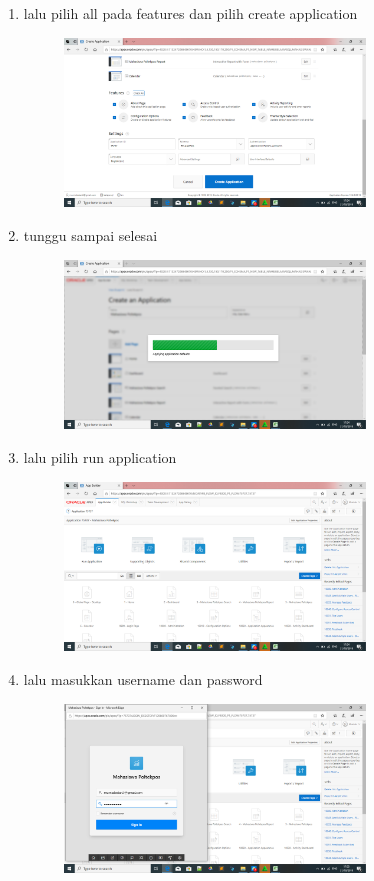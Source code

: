 \documentclass{article}
\begin{document}
\begin{enumerate}
\begin{figure}[h]
\end{figure}
\item lalu pilih all pada features dan pilih create application
    \begin{figure}[h]
   \centerline{\includegraphics[width=8cm]{figure/da.png}}
\end{figure}
\newpage\item tunggu sampai selesai
    \begin{figure}[h]
   \centerline{\includegraphics[width=8cm]{figure/ca.png}}
   \end{figure}
   \item lalu pilih run application
    \begin{figure}[h]
   \centerline{\includegraphics[width=8cm]{figure/c.png}}
\end{figure}
\newpage\item lalu masukkan username dan password
    \begin{figure}[h]
   \centerline{\includegraphics[width=8cm]{figure/ce.png}}

\end{figure}
\end{enumerate}
\end{document}
